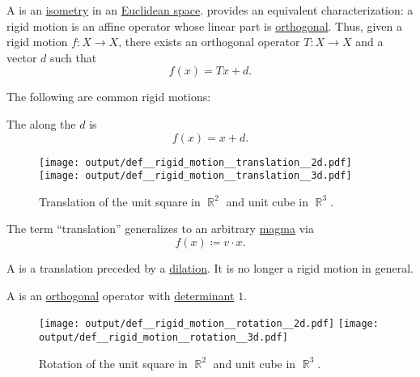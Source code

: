 \begin{definition}\label{def:rigid_motion}\mimprovised
  A  is an \hyperref[def:isometry]{isometry} in an \hyperref[def:euclidean_space]{Euclidean space}.  provides an equivalent characterization: a rigid motion is an affine operator whose linear part is \hyperref[def:unitary_operator]{orthogonal}. Thus, given a rigid motion \( f: X \to X \), there exists an orthogonal operator \( T: X \to X \) and a vector \( d \) such that
  \begin{equation*}
    f(x) = Tx + d.
  \end{equation*}

  The following are common rigid motions:
  \begin{thmenum}
     The  along the  \( d \) is
    \begin{equation*}
      f(x) = x + d.
    \end{equation*}

    \begin{figure}[!ht]
      \hfill
      \texttt{[image: output/def\_\_rigid\_motion\_\_translation\_\_2d.pdf]}
      \hfill
      \texttt{[image: output/def\_\_rigid\_motion\_\_translation\_\_3d.pdf]}
      \hfill
      \hfill
      \caption{Translation of the unit square in \( \BbbR^2 \) and unit cube in \( \BbbR^3 \).}\label{fig:def/rigid_motion/translation}
    \end{figure}

    The term \enquote{translation} generalizes to an arbitrary \hyperref[def:magma]{magma} via
    \begin{equation*}
      f(x) \coloneqq v \cdot x.
    \end{equation*}

    A  is a translation preceded by a \hyperref[rem:point]{dilation}. It is no longer a rigid motion in general.

     A  is an \hyperref[def:orthogonal_operator]{orthogonal} operator with \hyperref[def:matrix_determinant]{determinant} \( 1 \).

    \begin{figure}[!ht]
      \hfill
      \texttt{[image: output/def\_\_rigid\_motion\_\_rotation\_\_2d.pdf]}
      \hfill
      \texttt{[image: output/def\_\_rigid\_motion\_\_rotation\_\_3d.pdf]}
      \hfill
      \hfill
      \caption{Rotation of the unit square in \( \BbbR^2 \) and unit cube in \( \BbbR^3 \).}\label{fig:def/rigid_motion/rotation}
    \end{figure}


\end{thmenum}
\end{definition}
